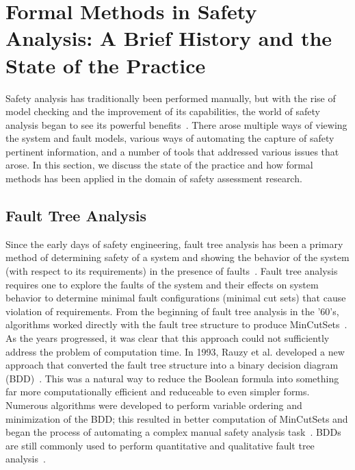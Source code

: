 \section{Formal Methods in Safety Analysis: A Brief History and the State of the Practice}
\label{sec:modelCheckingInSA}
Safety analysis has traditionally been performed manually, but with the rise of model checking and the improvement of its capabilities, the world of safety analysis began to see its powerful benefits~\cite{hinchey2012industrial, liggesmeyer1998improving, coudert1993fault, Bozzano:2010:DSA:1951720,bozzano2003esacs}. There arose multiple ways of viewing the system and fault models, various ways of automating the capture of safety pertinent information, and a number of tools that addressed various issues that arose. In this section, we discuss the state of the practice and how formal methods has been applied in the domain of safety assessment research.

\subsection{Fault Tree Analysis}
Since the early days of safety engineering, fault tree analysis has been a primary method of determining safety of a system and showing the behavior of the system (with respect to its requirements) in the presence of faults~\cite{0f356f05e72f43018211b36f97c8854a,vesely1981fault}. Fault tree analysis requires one to explore the faults of the system and their effects on system behavior to determine minimal fault configurations (minimal cut sets) that cause violation of requirements. From the beginning of fault tree analysis in the '60's, algorithms worked directly with the fault tree structure to produce MinCutSets~\cite{10020219108,semanderes1971elraft}. As the years progressed, it was clear that this approach could not sufficiently address the problem of computation time. In 1993, Rauzy et al. developed a new approach that converted the fault tree structure into a binary decision diagram (BDD)~\cite{rauzy1993new}. This was a natural way to reduce the Boolean formula into something far more computationally efficient and reduceable to even simpler forms. Numerous algorithms were developed to perform variable ordering and minimization of the BDD; this resulted in better computation of MinCutSets and began the process of automating a complex manual safety analysis task~\cite{sinnamon1997new,bryant1986graph,aralia1996computation,reay2002fault,rauzy2007assessment}. BDDs are still commonly used to perform quantitative and qualitative fault tree analysis~\cite{ge2015quantitative,jiang2018algebraic,banov2019new}.

